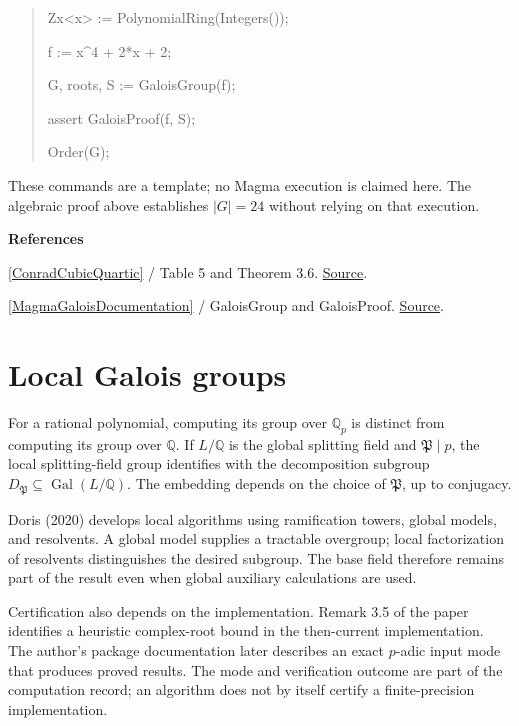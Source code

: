 \documentclass[11pt,a4paper,oneside,openany]{book}
\newenvironment{sources}{\par\smallskip\begingroup\footnotesize\color{atlasgray}\leftskip=10pt\setlength{\parskip}{2pt}}{\par\endgroup\smallskip}
\begin{document}
\begin{quote}\small\ttfamily\raggedright Zx<x> := PolynomialRing(Integers());\par 
f := x\textasciicircum{}4 + 2*x + 2;\par 
G, roots, S := GaloisGroup(f);\par 
assert GaloisProof(f, S);\par 
Order(G);\end{quote}
\color{black} These commands are a template; no Magma execution is claimed here. The algebraic proof above establishes \(|G|=24\) without relying on that execution.\par
\begin{sources}
\textbf{References}\par\smallskip
\noindent\hyperlink{ref:ConradCubicQuartic}{[ConradCubicQuartic]} / Table 5 and Theorem 3.6.  \href{https://kconrad.math.uconn.edu/blurbs/galoistheory/cubicquartic.pdf}{Source}.\par
\noindent\hyperlink{ref:MagmaGaloisDocumentation}{[MagmaGaloisDocumentation]} / GaloisGroup and GaloisProof.  \href{https://docs.magma-maths.org/GlobalFields/GaloisGroupsAndAutomorphisms/galois.html}{Source}.\par
\end{sources}\color{black}
\section{Local Galois groups}
\color{black} For a rational polynomial, computing its group over \(\mathbb Q_p\) is distinct from computing its group over \(\mathbb Q\). If \(L/\mathbb Q\) is the global splitting field and \(\mathfrak P\mid p\), the local splitting-field group identifies with the decomposition subgroup \(D_{\mathfrak P}\subseteq\operatorname{Gal}(L/\mathbb Q)\). The embedding depends on the choice of \(\mathfrak P\), up to conjugacy.\par
\color{black} Doris (2020) develops local algorithms using ramification towers, global models, and resolvents. A global model supplies a tractable overgroup; local factorization of resolvents distinguishes the desired subgroup. The base field therefore remains part of the result even when global auxiliary calculations are used.\par
\color{black} Certification also depends on the implementation. Remark 3.5 of the paper identifies a heuristic complex-root bound in the then-current implementation. The author's package documentation later describes an exact \(p\)-adic input mode that produces proved results. The mode and verification outcome are part of the computation record; an algorithm does not by itself certify a finite-precision implementation.\par
\end{document}
